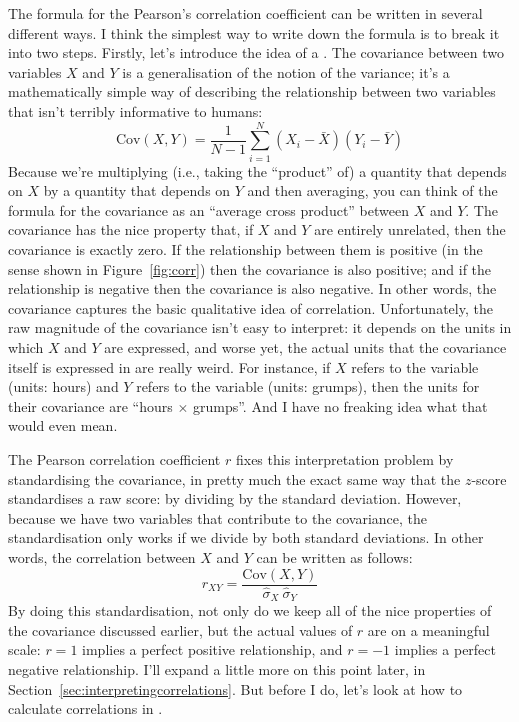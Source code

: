 The formula for the Pearson's correlation coefficient can be written in several different ways. I think the simplest way to write down the formula is to break it into two steps. Firstly, let's introduce the idea of a . The covariance between two variables $X$ and $Y$ is a generalisation of the notion of the variance; it's a mathematically simple way of describing the relationship between two variables that isn't terribly informative to humans:
$$
\mbox{Cov}(X,Y) = \frac{1}{N-1} \sum_{i=1}^N \left( X_i - \bar{X} \right) \left( Y_i - \bar{Y} \right)
$$
Because we're multiplying (i.e., taking the ``product'' of) a quantity that depends on $X$ by a quantity that depends on $Y$ and then averaging, you can think of the formula for the covariance as an ``average cross product'' between $X$ and $Y$. The covariance has the nice property that, if $X$ and $Y$ are entirely unrelated, then the covariance is exactly zero. If the relationship between them is positive (in the sense shown in Figure~\ref{fig:corr}) then the covariance is also positive; and if the relationship is negative then the covariance is also negative. In other words, the covariance captures the basic qualitative idea of correlation. Unfortunately, the raw magnitude of the covariance isn't easy to interpret: it depends on the units in which $X$ and $Y$ are expressed, and worse yet, the actual units that the covariance itself is expressed in are really weird. For instance, if $X$ refers to the  variable (units: hours) and $Y$ refers to the  variable (units: grumps), then the units for their covariance are ``hours $\times$ grumps''. And I have no freaking idea what that would even mean. 

The Pearson correlation coefficient $r$ fixes this interpretation problem by standardising the covariance, in pretty much the exact same way that the $z$-score standardises a raw score: by dividing by the standard deviation. However, because we have two variables that contribute to the covariance, the standardisation only works if we divide by both standard deviations.  In other words, the correlation between $X$ and $Y$ can be written as follows:
$$
r_{XY}  = \frac{\mbox{Cov}(X,Y)}{ \hat{\sigma}_X \ \hat{\sigma}_Y}
$$
By doing this standardisation, not only do we keep all of the nice properties of the covariance discussed earlier, but the actual values of $r$ are on a meaningful scale: $r= 1$ implies a perfect positive relationship, and $r = -1$ implies a perfect negative relationship. I'll expand a little more on this point later, in Section~\ref{sec:interpretingcorrelations}. But before I do, let's look at how to calculate correlations in \R.




